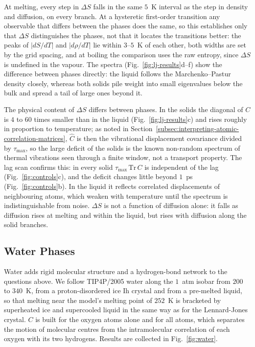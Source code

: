 At melting, every step in $\Delta S$ falls in the same $5$~K interval as the step in density and diffusion, on every branch.
At a hysteretic first-order transition any observable that differs between the phases does the same, so this establishes only that $\Delta S$ distinguishes the phases, not that it locates the transitions better: the peaks of $|dS/dT|$ and $|d\rho/dT|$ lie within $3$--$5$~K of each other, both widths are set by the grid spacing, and at boiling the comparison uses the raw entropy, since $\Delta S$ is undefined in the vapour.
The spectra (Fig.~\ref{fig:lj-results}d--f) show the difference between phases directly: the liquid follows the Marchenko--Pastur density closely, whereas both solids pile weight into small eigenvalues below the bulk and spread a tail of large ones beyond it.

The physical content of $\Delta S$ differs between phases.
In the solids the diagonal of $C$ is $4$ to $60$ times smaller than in the liquid (Fig.~\ref{fig:lj-results}c) and rises roughly in proportion to temperature; as noted in Section~\ref{subsec:interpreting-atomic-correlation-matrices}, $\hat{C}$ is then the vibrational displacement covariance divided by $\tau_{\max}$, so the large deficit of the solids is the known non-random spectrum of thermal vibrations seen through a finite window, not a transport property.
The lag scan confirms this: in every solid $\tau_{\max}\,\mathrm{Tr}\,C$ is independent of the lag (Fig.~\ref{fig:controls}c), and the deficit changes little beyond $1$~ps (Fig.~\ref{fig:controls}b).
In the liquid it reflects correlated displacements of neighbouring atoms, which weaken with temperature until the spectrum is indistinguishable from noise.
$\Delta S$ is not a function of diffusion alone: it falls as diffusion rises at melting and within the liquid, but rises with diffusion along the solid branches.

\subsection{Water Phases}
\label{subsec:water-phases}
Water adds rigid molecular structure and a hydrogen-bond network to the questions above.
We follow TIP4P/2005 water along the $1$~atm isobar from $200$ to $340$~K, from a proton-disordered ice Ih crystal and from a pre-melted liquid, so that melting near the model's melting point of $252$~K is bracketed by superheated ice and supercooled liquid in the same way as for the Lennard-Jones crystal.
$C$ is built for the oxygen atoms alone and for all atoms, which separates the motion of molecular centres from the intramolecular correlation of each oxygen with its two hydrogens.
Results are collected in Fig.~\ref{fig:water}.

